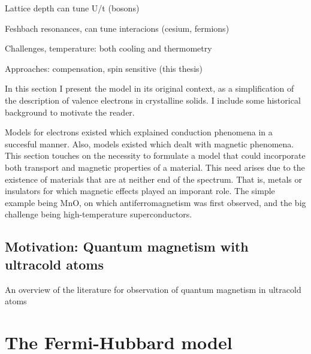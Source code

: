 \documentclass[oneside,11pt]{memoir}
\begin{document}
Lattice depth can tune U/t  (bosons) 
 
Feshbach resonances, can tune interacions (cesium, fermions)  

Challenges, temperature:  both cooling and thermometry

Approaches:  compensation,  spin sensitive (this thesis)  




In this section I present the model in its original context, as a
simplification of the description of valence electrons in crystalline solids.
I include some historical background to motivate the reader.  

Models for electrons existed which explained conduction phenomena in a
succesful manner.  Also, models existed which dealt with magnetic phenomena.
This section touches on the necessity to formulate a model that could
incorporate both transport and magnetic properties of a material.   This need
arises due to the existence of materials that are at neither end of the
spectrum.  That is, metals or insulators for which magnetic effects played an
imporant role.   The simple example being MnO, on which antiferromagnetism was
first observed,  and the big challenge being high-temperature
superconductors. 

\section{ Motivation:  Quantum magnetism with ultracold atoms }

An overview of the literature for observation of quantum magnetism in ultracold
atoms






\chapter{The Fermi-Hubbard model}
\end{document}
